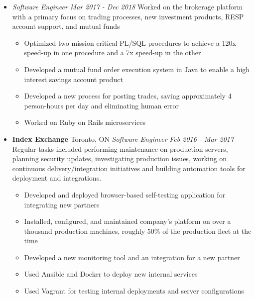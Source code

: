 \documentclass[letterpaper,11pt]{article}
\newcommand{\resumeSubHeading}[4]{
	\item[]
      \textbf{#1} \hfill #2 \newline
      \textit{#3} \hfill \textit{#4}
}
\newcommand{\jobAtSamePlace}[2]{
	\item[]
      \textit{#1} \hfill \textit{#2}
}
\begin{document}
\begin{itemize}[leftmargin=*]
	  {Engineering Team Lead}{Dec 2018 - Apr 2019}\newline
	  Led a full stack team of 4 engineers in the Wealthsimple For Advisors organization
      \begin{itemize}[noitemsep,topsep=0pt]
      	\item Developed new mutual fund process automation in PL/SQL and Java
      	\item Assisted in hiring for the Wealthsimple For Advisors Domain
      \end{itemize}
      \jobAtSamePlace
      {Software Engineer}{Mar 2017 - Dec 2018}\newline
      Worked on the brokerage platform with a primary focus on trading processes, new investment products, RESP account support, and mutual funds
      \begin{itemize}[noitemsep,topsep=0pt]
      	\item Optimized two mission critical PL/SQL procedures to achieve a 120x speed-up in one procedure and a 7x speed-up in the other
      	\item Developed a mutual fund order execution system in Java to enable a high interest savings account product
      	\item Developed a new process for posting trades, saving approximately 4 person-hours per day and eliminating human error
        \item Worked on Ruby on Rails microservices
      \end{itemize}
	    
	\resumeSubHeading
      {Index Exchange}{Toronto, ON}
      {Software Engineer}{Feb 2016 - Mar 2017}\newline
      Regular tasks included performing maintenance on production servers, planning security updates, investigating production issues, working on continuous delivery/integration initiatives and building automation tools for deployment and integrations.
      \begin{itemize}[noitemsep,topsep=0pt]
        \item Developed and deployed browser-based self-testing application for integrating new partners
        \item Installed, configured, and maintained company's platform on over a thousand production machines, roughly 50\% of the production fleet at the time
        \item Developed a new monitoring tool and an integration for a new partner
        \item Used Ansible and Docker to deploy new internal services
        \item Used Vagrant for testing internal deployments and server configurations
      \end{itemize}    
\end{itemize}
\end{document}
